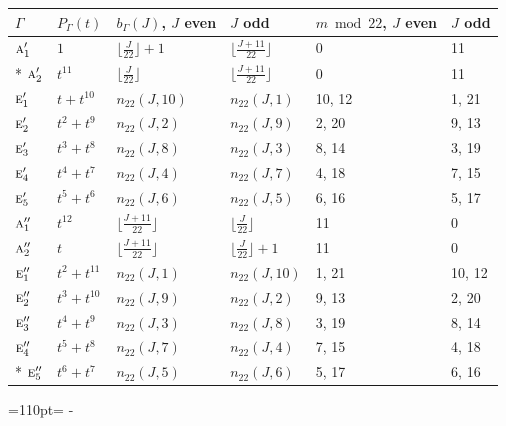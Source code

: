 \documentclass[10pt,a4paper]{article}
\newcommand{\needspace}[1]{\par\penalty-100\begingroup\dimen0=#1\relax\dimen2=\pagegoal
  \advance\dimen2-\pagetotal\ifdim\dimen0>\dimen2\relax\ifdim\dimen2>0pt\vfil\break\fi\fi
  \endgroup}
\numberwithin{equation}{section}
\newcommand{\irr}[1]{\text{\normalfont\scshape #1}}
\begin{document}
{\small{\renewcommand{\arraystretch}{1.3}\begin{longtable}{@{}llllll@{}}\toprule
$\Gamma$ & $P_\Gamma(t)$ & $b_\Gamma(J)$, $J$ even & $J$ odd & $m \bmod 22$, $J$ even & $J$ odd\\\midrule\endhead
\bottomrule\endfoot\endlastfoot
$\irr{a}_{1}'$ & $1$ & $\bigl\lfloor\tfrac{J}{22}\bigr\rfloor + 1$ & $\bigl\lfloor\tfrac{J+11}{22}\bigr\rfloor$ & 0 & 11\\*
$\irr{a}_{2}'$ & $t^{11}$ & $\bigl\lfloor\tfrac{J}{22}\bigr\rfloor$ & $\bigl\lfloor\tfrac{J+11}{22}\bigr\rfloor$ & 0 & 11\\
$\irr{e}_{1}'$ & $t + t^{10}$ & $n_{22}(J,10)$ & $n_{22}(J,1)$ & 10, 12 & 1, 21\\
$\irr{e}_{2}'$ & $t^{2} + t^{9}$ & $n_{22}(J,2)$ & $n_{22}(J,9)$ & 2, 20 & 9, 13\\
$\irr{e}_{3}'$ & $t^{3} + t^{8}$ & $n_{22}(J,8)$ & $n_{22}(J,3)$ & 8, 14 & 3, 19\\
$\irr{e}_{4}'$ & $t^{4} + t^{7}$ & $n_{22}(J,4)$ & $n_{22}(J,7)$ & 4, 18 & 7, 15\\
$\irr{e}_{5}'$ & $t^{5} + t^{6}$ & $n_{22}(J,6)$ & $n_{22}(J,5)$ & 6, 16 & 5, 17\\
$\irr{a}_{1}''$ & $t^{12}$ & $\bigl\lfloor\tfrac{J+11}{22}\bigr\rfloor$ & $\bigl\lfloor\tfrac{J}{22}\bigr\rfloor$ & 11 & 0\\
$\irr{a}_{2}''$ & $t$ & $\bigl\lfloor\tfrac{J+11}{22}\bigr\rfloor$ & $\bigl\lfloor\tfrac{J}{22}\bigr\rfloor + 1$ & 11 & 0\\
$\irr{e}_{1}''$ & $t^{2} + t^{11}$ & $n_{22}(J,1)$ & $n_{22}(J,10)$ & 1, 21 & 10, 12\\
$\irr{e}_{2}''$ & $t^{3} + t^{10}$ & $n_{22}(J,9)$ & $n_{22}(J,2)$ & 9, 13 & 2, 20\\
$\irr{e}_{3}''$ & $t^{4} + t^{9}$ & $n_{22}(J,3)$ & $n_{22}(J,8)$ & 3, 19 & 8, 14\\
$\irr{e}_{4}''$ & $t^{5} + t^{8}$ & $n_{22}(J,7)$ & $n_{22}(J,4)$ & 7, 15 & 4, 18\\*
$\irr{e}_{5}''$ & $t^{6} + t^{7}$ & $n_{22}(J,5)$ & $n_{22}(J,6)$ & 5, 17 & 6, 16\\
\bottomrule\end{longtable}}}
\needspace{110pt}
\end{document}
